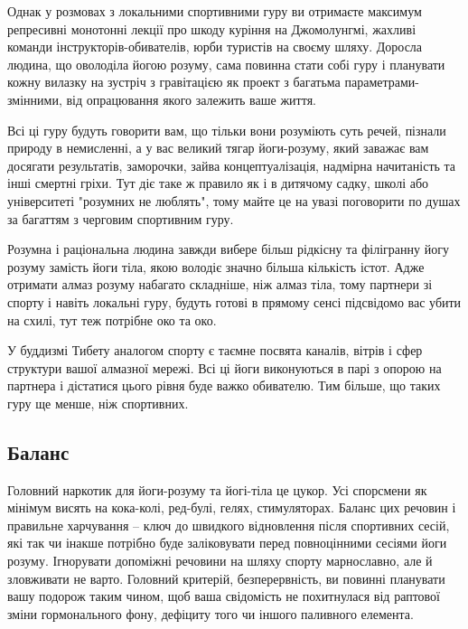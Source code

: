 Однак у розмовах з локальними спортивними гуру
ви отримаєте максимум репресивні монотонні лекції
про шкоду куріння на Джомолунгмі, жахливі команди
інструкторів-обивателів, юрби туристів на своєму
шляху. Доросла людина, що оволоділа йогою розуму,
сама повинна стати собі гуру і планувати кожну
вилазку на зустріч з гравітацією як проект з
багатьма параметрами-змінними, від опрацювання
якого залежить ваше життя.

Всі ці гуру будуть говорити вам, що тільки вони
розуміють суть речей, пізнали природу в немисленні,
а у вас великий тягар йоги-розуму, який заважає
вам досягати результатів, заморочки, зайва
концептуалізація, надмірна начитаність та інші
смертні гріхи. Тут діє таке ж правило як і в
дитячому садку, школі або університеті "розумних
не люблять", тому майте це на увазі поговорити
по душах за багаттям з черговим спортивним гуру.

Розумна і раціональна людина завжди вибере більш
рідкісну та філігранну йогу розуму замість йоги
тіла, якою володіє значно більша кількість істот.
Адже отримати алмаз розуму набагато складніше,
ніж алмаз тіла, тому партнери зі спорту і навіть
локальні гуру, будуть готові в прямому сенсі
підсвідомо вас убити на схилі, тут теж потрібне око та око.

У буддизмі Тибету аналогом спорту є таємне
посвята каналів, вітрів і сфер структури вашої
алмазної мережі. Всі ці йоги виконуються в парі
з опорою на партнера і дістатися цього рівня буде
важко обивателю. Тим більше, що таких гуру ще
менше, ніж спортивних.

\newpage
\subsection{Баланс}

Головний наркотик для йоги-розуму та йогі-тіла
це цукор. Усі спорсмени як мінімум висять на
кока-колі, ред-булі, гелях, стимуляторах. Баланс
цих речовин і правильне харчування – ключ до
 швидкого відновлення після спортивних сесій,
які так чи інакше потрібно буде заліковувати
перед повноцінними сесіями йоги розуму. Ігнорувати
допоміжні  речовини на шляху спорту марнославно, але
й зловживати не варто. Головний критерій,
безперервність, ви повинні планувати вашу
подорож таким чином, щоб ваша свідомість
не похитнулася від раптової зміни гормонального
фону, дефіциту того чи іншого паливного елемента.

\normalsize
